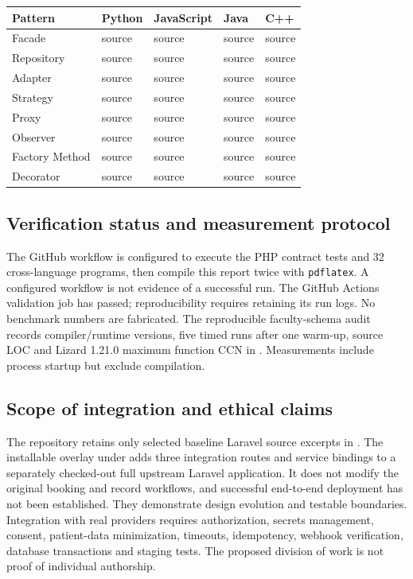 \documentclass[11pt,a4paper]{article}
\newcommand{\code}[1]{\texttt{\detokenize{#1}}}
\begin{document}
\begin{center}\small
\begin{tabular}{lllll}\toprule
Pattern & Python & JavaScript & Java & C++\\\midrule
Facade & source & source & source & source\\
Repository & source & source & source & source\\
Adapter & source & source & source & source\\
Strategy & source & source & source & source\\
Proxy & source & source & source & source\\
Observer & source & source & source & source\\
Factory Method & source & source & source & source\\
Decorator & source & source & source & source\\\bottomrule
\end{tabular}
\end{center}

\subsection{Verification status and measurement protocol}
The GitHub workflow is configured to execute the PHP contract tests and 32 cross-language programs, then compile this report twice with \texttt{pdflatex}. A configured workflow is not evidence of a successful run. The GitHub Actions validation job has passed; reproducibility requires retaining its run logs. No benchmark numbers are fabricated. The reproducible faculty-schema audit records compiler/runtime versions, five timed runs after one warm-up, source LOC and Lizard 1.21.0 maximum function CCN in . Measurements include process startup but exclude compilation.

\subsection{Scope of integration and ethical claims}
The repository retains only selected baseline Laravel source excerpts in \code{data/code/}. The installable overlay under \code{laravel_integration/} adds three integration routes and service bindings to a separately checked-out full upstream Laravel application. It does not modify the original booking and record workflows, and successful end-to-end deployment has not been established. They demonstrate design evolution and testable boundaries. Integration with real providers requires authorization, secrets management, consent, patient-data minimization, timeouts, idempotency, webhook verification, database transactions and staging tests. The proposed division of work is not proof of individual authorship.
\end{document}
